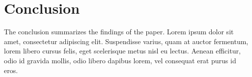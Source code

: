\section{Conclusion}
The conclusion summarizes the findings of the paper. Lorem ipsum dolor sit amet,
consectetur adipiscing elit. Suspendisse varius, quam at auctor fermentum, lorem libero cursus felis, 
eget scelerisque metus nisl eu lectus. Aenean efficitur, odio id gravida mollis, odio libero dapibus lorem,
vel consequat erat purus id eros.
